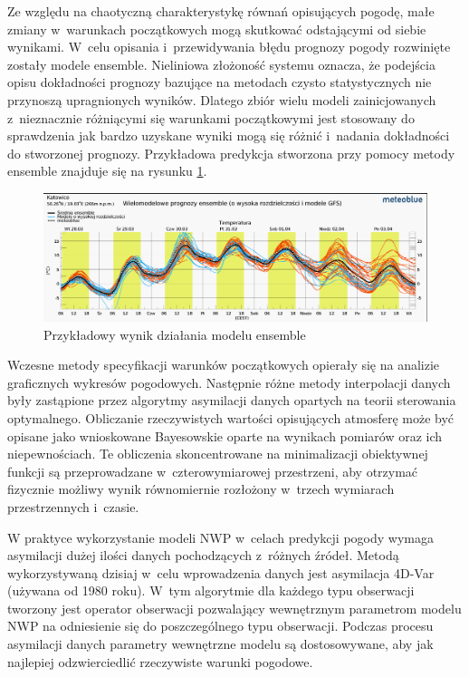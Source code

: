 
Ze względu na chaotyczną charakterystykę równań opisujących pogodę, małe zmiany w~warunkach początkowych
mogą skutkować odstającymi od siebie wynikami. W~celu opisania i~przewidywania błędu prognozy pogody 
rozwinięte zostały modele ensemble. Nieliniowa złożoność systemu oznacza, że podejścia opisu
dokładności prognozy bazujące na metodach czysto statystycznych nie przynoszą upragnionych wyników.
Dlatego zbiór wielu modeli zainicjowanych z~nieznacznie różniącymi się warunkami początkowymi
jest stosowany do sprawdzenia jak bardzo uzyskane wyniki mogą się różnić i~nadania dokładności do 
stworzonej prognozy. Przykładowa predykcja stworzona przy pomocy metody ensemble znajduje się 
na rysunku \ref{nwp-ensemble}.

\begin{figure}[H]
    \centering
    \includegraphics[width=\textwidth]{images/multimodel.png}
    \caption[Wynik modelu ensemble]{Przykładowy wynik działania modelu ensemble\footnotemark}
    \label{nwp-ensemble}
\end{figure}

Wczesne metody specyfikacji warunków początkowych opierały się na analizie graficznych wykresów 
pogodowych. Następnie różne metody interpolacji danych były zastąpione przez algorytmy
asymilacji danych opartych na teorii sterowania optymalnego. Obliczanie rzeczywistych wartości
opisujących atmosferę może być opisane jako wnioskowane Bayesowskie oparte na wynikach pomiarów
oraz ich niepewnościach. Te obliczenia skoncentrowane na minimalizacji obiektywnej funkcji 
są przeprowadzane w~czterowymiarowej przestrzeni, aby otrzymać fizycznie możliwy wynik
równomiernie rozłożony w~trzech wymiarach przestrzennych i~czasie.

W praktyce wykorzystanie modeli NWP w~celach predykcji pogody wymaga asymilacji dużej ilości
danych pochodzących z~różnych źródeł. Metodą wykorzystywaną dzisiaj w~celu wprowadzenia
danych jest asymilacja 4D-Var (używana od 1980 roku). W~tym algorytmie dla każdego typu obserwacji tworzony jest
operator obserwacji pozwalający wewnętrznym parametrom modelu NWP na odniesienie się
do poszczególnego typu obserwacji. Podczas procesu asymilacji danych parametry wewnętrzne
modelu są dostosowywane, aby jak najlepiej odzwierciedlić rzeczywiste warunki pogodowe.

